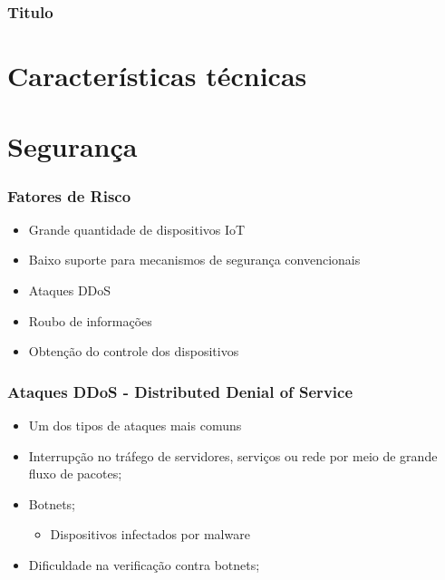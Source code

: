 \documentclass[12pt]{beamer}
\begin{document}
\begin{frame}
    \frametitle{Titulo}
\end{frame}

\section{Características técnicas}\label{Características técnicas}

\section{Segurança}\label{Segurança}

\begin{frame}
    \frametitle{Fatores de Risco}
    \begin{itemize}
        \item Grande quantidade de dispositivos IoT
        \item Baixo suporte para mecanismos de segurança convencionais
        \item Ataques DDoS
        \item Roubo de informações
        \item Obtenção do controle dos dispositivos
    \end{itemize}
        
\end{frame}

\begin{frame}
    \frametitle{Ataques DDoS - Distributed Denial of Service}
    \begin{itemize}
        \item Um dos tipos de ataques mais comuns
        \item Interrupção no tráfego de servidores, serviços ou rede por meio de grande fluxo de pacotes;
        \item Botnets;
                \begin{itemize}
                \item Dispositivos infectados por malware
            \end{itemize}
        \item Dificuldade na verificação contra botnets;
    \end{itemize}
\end{frame}
\end{document}
